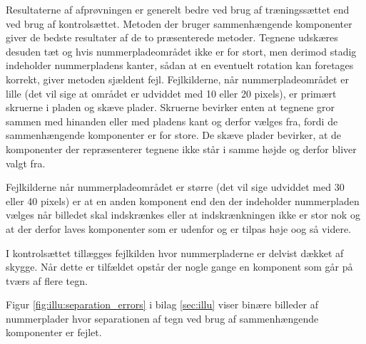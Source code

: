 
Resultaterne af afprøvningen er generelt bedre ved brug af træningssættet end ved brug af kontrolsættet. Metoden der bruger sammenhængende komponenter giver de bedste resultater af de to præsenterede metoder. Tegnene udskæres desuden tæt og hvis nummerpladeområdet ikke er for stort, men derimod stadig indeholder nummerpladens kanter, sådan at en eventuelt rotation kan foretages korrekt, giver metoden sjældent fejl. Fejlkilderne, når nummerpladeområdet er lille (det vil sige at området er udviddet med 10 eller 20 pixels), er primært skruerne i pladen og skæve plader. Skruerne bevirker enten at tegnene gror sammen med hinanden eller med pladens kant og derfor vælges fra, fordi de sammenhængende komponenter er for store. De skæve plader bevirker, at de komponenter der repræsenterer tegnene ikke står i samme højde og derfor bliver valgt fra.


Fejlkilderne når nummerpladeområdet er større (det vil sige udviddet med 30 eller 40 pixels) er at en anden komponent end den der indeholder nummerpladen vælges når billedet skal indskrænkes eller at indskrænkningen ikke er stor nok og at der derfor laves komponenter som er udenfor og er tilpas høje oog så videre.


I kontrolsættet tillægges fejlkilden hvor nummerpladerne er delvist dækket af skygge. Når dette er tilfældet opstår der nogle gange en komponent som går på tværs af flere tegn.

Figur \vref{fig:illu:separation_errors} i bilag \ref{sec:illu} viser binære billeder af nummerplader hvor separationen af tegn ved brug af sammenhængende komponenter er fejlet.



